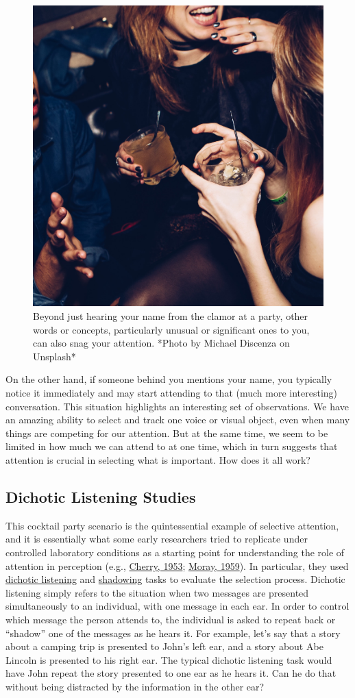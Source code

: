 \documentclass[
]{krantz}
\begin{document}
\begin{figure}

{\centering \includegraphics[width=0.45\linewidth]{images/3_attention/cocktailparty} 

}

\caption{Beyond just hearing your name from the clamor at a party, other words or concepts, particularly unusual or significant ones to you, can also snag your attention. *Photo by Michael Discenza on Unsplash*}\label{fig:cocktailparty}
\end{figure}

On the other hand, if someone behind you mentions your name, you typically notice it immediately and may start attending to that (much more interesting) conversation. This situation highlights an interesting set of observations. We have an amazing ability to select and track one voice or visual object, even when many things are competing for our attention. But at the same time, we seem to be limited in how much we can attend to at one time, which in turn suggests that attention is crucial in selecting what is important. How does it all work?

\hypertarget{dichotic-listening-studies}{%
\subsection*{Dichotic Listening Studies}\label{dichotic-listening-studies}}


This cocktail party scenario is the quintessential example of selective attention, and it is essentially what some early researchers tried to replicate under controlled laboratory conditions as a starting point for understanding the role of attention in perception (e.g., \protect\hyperlink{ref-Cherry1953}{Cherry, 1953}; \protect\hyperlink{ref-Moray1959}{Moray, 1959}). In particular, they used \protect\hyperlink{dichotic-listening}{dichotic listening} and \protect\hyperlink{shadowing}{shadowing} tasks to evaluate the selection process. Dichotic listening simply refers to the situation when two messages are presented simultaneously to an individual, with one message in each ear. In order to control which message the person attends to, the individual is asked to repeat back or ``shadow'' one of the messages as he hears it. For example, let's say that a story about a camping trip is presented to John's left ear, and a story about Abe Lincoln is presented to his right ear. The typical dichotic listening task would have John repeat the story presented to one ear as he hears it. Can he do that without being distracted by the information in the other ear?
\end{document}
